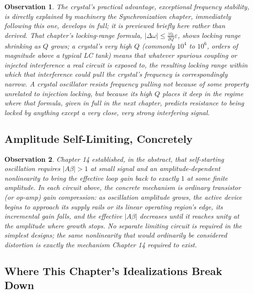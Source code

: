 \documentclass[12pt]{article}
\newtheorem{observation}{Observation}
\begin{document}
\begin{observation}
The crystal's practical advantage, exceptional frequency stability, is directly explained by machinery the Synchronization chapter, immediately following this one, develops in full; it is previewed briefly here rather than derived. That chapter's locking-range formula, $|\Delta\omega| \leq \frac{\omega_0}{2Q}\varepsilon$, shows locking range shrinking as $Q$ grows; a crystal's very high $Q$ (commonly $10^4$ to $10^6$, orders of magnitude above a typical LC tank) means that whatever spurious coupling or injected interference a real circuit is exposed to, the resulting locking range within which that interference could pull the crystal's frequency is correspondingly narrow. A crystal oscillator resists frequency pulling not because of some property unrelated to injection locking, but because its high $Q$ places it deep in the regime where that formula, given in full in the next chapter, predicts resistance to being locked by anything except a very close, very strong interfering signal.
\end{observation}

\subsection{Amplitude Self-Limiting, Concretely}

\begin{observation}
Chapter 14 established, in the abstract, that self-starting oscillation requires $|A\beta|>1$ at small signal and an amplitude-dependent nonlinearity to bring the effective loop gain back to exactly $1$ at some finite amplitude. In each circuit above, the concrete mechanism is ordinary transistor (or op-amp) gain compression: as oscillation amplitude grows, the active device begins to approach its supply rails or its linear operating region's edge, its incremental gain falls, and the effective $|A\beta|$ decreases until it reaches unity at the amplitude where growth stops. No separate limiting circuit is required in the simplest designs; the same nonlinearity that would ordinarily be considered distortion is exactly the mechanism Chapter 14 required to exist.
\end{observation}

\subsection{Where This Chapter's Idealizations Break Down}
\end{document}
